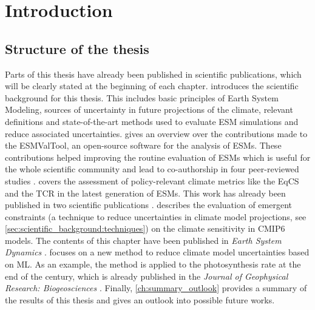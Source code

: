 


\chapter{Introduction}
\label{ch:introduction}


\section{Structure of the thesis}
\label{sec:introduction:structure}

Parts of this thesis have already been published in scientific publications,
which will be clearly stated at the beginning of each chapter.
 introduces the scientific background for this
thesis. This includes basic principles of Earth System Modeling, sources of
uncertainty in future projections of the climate, relevant definitions and
state-of-the-art methods used to evaluate \ac{ESM} simulations and reduce
associated uncertainties.  gives an overview over the
contributions made to the \ac{ESMValTool}, an open-source software for the
analysis of \acp{ESM}. These contributions helped improving the routine
evaluation of \acp{ESM} which is useful for the whole scientific community and
lead to co-authorship in four peer-reviewed studies
\autocite{Righi2020, Eyring2020, Lauer2020, Weigel2020}.
 covers the assessment of policy-relevant
climate metrics like the \acl{EqCS} and the \acl{TCR} in the latest generation
of \acp{ESM}. This work has already been published in two scientific
publications \autocite{Bock2020, Meehl2020}.  describes the
evaluation of emergent constraints (a technique to reduce uncertainties in
climate model projections, see \vref{sec:scientific_background:techniques}) on
the climate sensitivity in \acs{CMIP6} models. The contents of this chapter
have been published in \emph{Earth System Dynamics} \autocite{Schlund2020a}.
 focuses on a new method to reduce climate model
uncertainties based on \ac{ML}. As an example, the method is applied to the
photosynthesis rate at the end of the \tfst{} century, which is already
published in the \emph{Journal of Geophysical Research: Biogeosciences}
\autocite{Schlund2020}. Finally, \cref{ch:summary_outlook} provides a summary
of the results of this thesis and gives an outlook into possible future works.